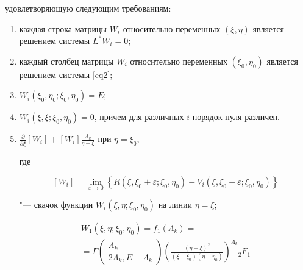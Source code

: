 удовлетворяющую следующим требованиям:

\begin{enumerate}

 \item каждая строка матрицы $W_i$ относительно переменных $(\xi,\eta)$ является решением системы $L^*W_i=0$;

 \item каждый столбец матрицы $W_i$  относительно переменных $(\xi_0,\eta_0)$ является решением системы \eqref{eq2};

 \item $W_i(\xi_0,\eta_0;\xi_0,\eta_0)=E$;

 \item $W_i(\xi,\xi;\xi_0,\eta_0)=0$, причем для различных $i$ порядок нуля различен.

 \item $\displaystyle \frac{\partial}{\partial \xi}\left[ W_i\right] + \left[ W_i\right]\frac{\Lambda_k}{\eta-\xi}$ при $\eta=\xi_0$, 

где 

$$\left[ W_i\right] = \lim\limits_{\varepsilon \to 0} \left\lbrace R(\xi,\xi_0+\varepsilon;\xi_0,\eta_0)-V_i(\xi,\xi_0+\varepsilon;\xi_0,\eta_0)\right\rbrace$$ 

"--- скачок функции $W_i(\xi,\eta;\xi_0,\eta_0)$ на линии $\eta=\xi$;

\begin{multline*}

 W_1(\xi,\eta;\xi_0,\eta_0)=f_1(\Lambda_k)=

 \\

= 

 \Gamma \left(

\begin{array}{c}

 \Lambda_k\\

2\Lambda_k,E-\Lambda_k

\end{array}

\right)

\left(

\frac{(\eta-\xi)^2}{(\xi-\xi_0)(\eta-\eta_0)}

\right)^{\Lambda_k}




{}_2 F_1


\end{multline*}
\end{enumerate}
